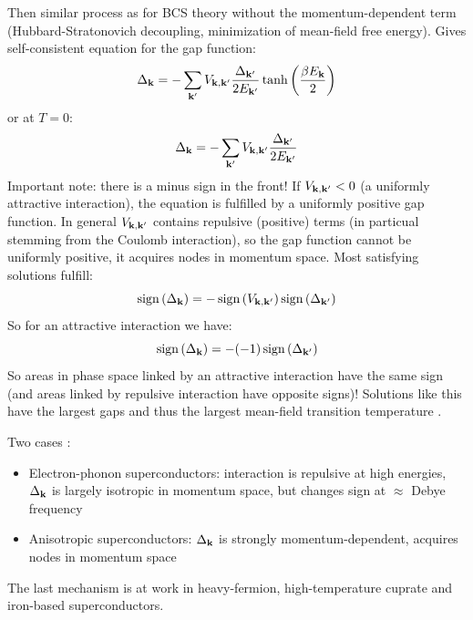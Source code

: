 Then similar process as for BCS theory without the momentum-dependent term (Hubbard-Stratonovich decoupling, minimization of mean-field free energy).
Gives self-consistent equation for the gap function:
\begin{equation}
    \Delta_{\mathbf{k}} = - \sum_{\mathbf{k}^{\prime}} V_{\mathbf{k}, \mathbf{k}^{\prime}}  \frac{\Delta_{\mathbf{k}^{\prime}}}{2 E_{\mathbf{k}^{\prime}}} \tanh{\left(\frac{\beta E_{\mathbf{k}}}{2}\right)}
\end{equation}
or at \(T = 0\):
\begin{equation}
    \Delta_{\mathbf{k}} = - \sum_{\mathbf{k}^{\prime}} V_{\mathbf{k}, \mathbf{k}^{\prime}}  \frac{\Delta_{\mathbf{k}^{\prime}}}{2 E_{\mathbf{k}^{\prime}}}
\end{equation}
Important note: there is a minus sign in the front!
If \(V_{\mathbf{k}, \mathbf{k}^{\prime}} < 0\) (a uniformly attractive interaction), the equation is fulfilled by a uniformly positive gap function.
In general \(V_{\mathbf{k}, \mathbf{k}^{\prime}}\) contains repulsive (positive) terms (in particual stemming from the Coulomb interaction), so the gap function cannot be uniformly positive, it acquires nodes in momentum space.
Most satisfying solutions fulfill:
\begin{equation}
    \operatorname{sign}{(\Delta_{\mathbf{k}})} = - \operatorname{sign}{(V_{\mathbf{k}, \mathbf{k}^{\prime}})} \operatorname{sign}{(\Delta_{\mathbf{k}^{\prime}})}
\end{equation}
So for an attractive interaction we have:
\begin{equation}
    \operatorname{sign}{(\Delta_{\mathbf{k}})} = -(-1) \operatorname{sign}{(\Delta_{\mathbf{k}^{\prime}})}
\end{equation}
So areas in phase space linked by an attractive interaction have the same sign (and areas linked by repulsive interaction have opposite signs)!
Solutions like this have the largest gaps and thus the largest mean-field transition temperature  .

Two cases :
\begin{itemize}
    \item Electron-phonon superconductors: interaction is repulsive at high energies, \(\Delta_{\mathbf{k}}\) is largely isotropic in momentum space, but changes sign at \(\approx\) Debye frequency
    \item Anisotropic superconductors: \(\Delta_{\mathbf{k}}\) is strongly momentum-dependent, acquires nodes in momentum space
\end{itemize}
The last mechanism is at work in heavy-fermion, high-temperature cuprate  and iron-based superconductors.

